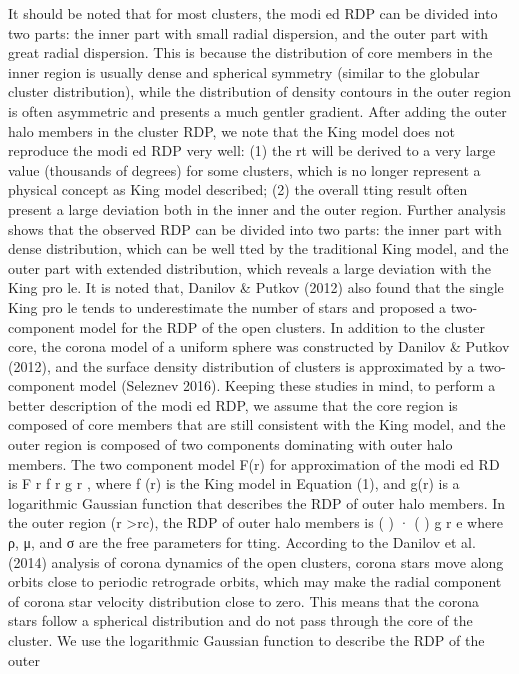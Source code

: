 \documentclass[../Main.tex]{subfiles}
\begin{document}
{It should be noted that for most clusters, the modi ed RDP
can be divided into two parts: the inner part with small radial
dispersion, and the outer part with great radial dispersion. This
is because the distribution of core members in the inner region
is usually dense and spherical symmetry (similar to the globular
cluster distribution), while the distribution of density contours
in the outer region is often asymmetric and presents a much
gentler gradient. After adding the outer halo members in the
cluster RDP, we note that the King model does not reproduce
the modi ed RDP very well: (1) the rt will be derived to a very
large value (thousands of degrees) for some clusters, which is
no longer represent a physical concept as King model
described; (2) the overall tting result often present a large
deviation both in the inner and the outer region.
Further analysis shows that the observed RDP can be divided
into two parts: the inner part with dense distribution, which can
be well tted by the traditional King model, and the outer part
with extended distribution, which reveals a large deviation with
the King pro le. It is noted that, Danilov & Putkov (2012) also
found that the single King pro le tends to underestimate the
number of stars and proposed a two-component model for the RDP of the open clusters. In addition to the cluster core,
the corona model of a uniform sphere was constructed by
Danilov & Putkov (2012), and the surface density distribution
of clusters is approximated by a two-component model
(Seleznev 2016). Keeping these studies in mind, to perform a
better description of the modi ed RDP, we assume that the core
region is composed of core members that are still consistent
with the King model, and the outer region is composed of two
components dominating with outer halo members. The two
component model F(r) for approximation of the modi ed RD
is
F r f r g r ,
where f (r) is the King model in Equation (1), and g(r) is a
logarithmic Gaussian function that describes the RDP of outer
halo members. In the outer region (r >rc), the RDP of outer
halo members is
 ( ) · ( )
g r e 
where ρ, μ, and σ are the free parameters for tting.
According to the Danilov et al. (2014) analysis of corona
dynamics of the open clusters, corona stars move along orbits
close to periodic retrograde orbits, which may make the radial
component of corona star velocity distribution close to zero.
This means that the corona stars follow a spherical distribution
and do not pass through the core of the cluster. We use the
logarithmic Gaussian function to describe the RDP of the outer
}
\end{document}
